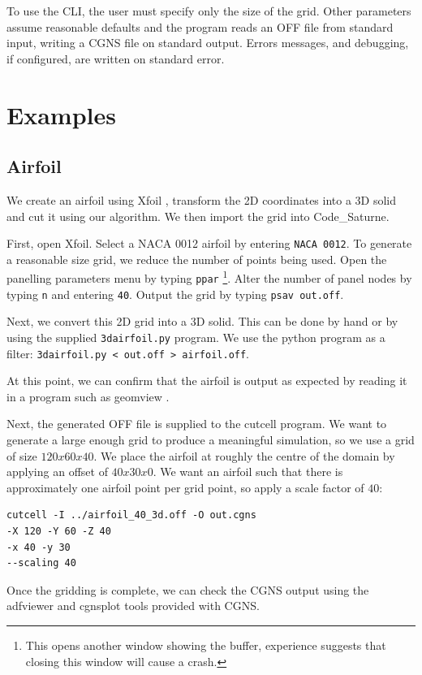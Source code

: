 \documentclass[a4paper,10pt]{article}
\begin{document}
To use the CLI, the user must specify only the size of the grid. Other
parameters assume reasonable defaults and the program reads an OFF file from
standard input, writing a CGNS file on standard output. Errors messages, and
debugging, if configured, are written on standard error.

\section{Examples}

\subsection{Airfoil}

We create an airfoil using Xfoil \cite{xfoil}, transform the 2D coordinates into
a 3D solid and cut it using our algorithm. We then import the grid into
Code\_Saturne.

First, open Xfoil. Select a NACA 0012 airfoil by entering \texttt{NACA 0012}. To
generate a reasonable size grid, we reduce the number of points being used. Open
the panelling parameters menu by typing \texttt{ppar} \footnote{This opens
another window showing the buffer, experience suggests that closing this window
will cause a crash.}. Alter the number of panel nodes by typing \texttt{n} and
entering \texttt{40}. Output the grid by typing \texttt{psav out.off}.

Next, we convert this 2D grid into a 3D solid. This can be done by hand or by
using the supplied \texttt{3dairfoil.py} program. We use the python program as
a filter: \texttt{3dairfoil.py < out.off > airfoil.off}.

At this point, we can confirm that the airfoil is output as expected by reading
it in a program such as geomview \cite{geomview}.

Next, the generated OFF file is supplied to the cutcell program. We want to
generate a large enough grid to produce a meaningful simulation, so we use a
grid of size $120 x 60 x 40$. We place the airfoil at roughly the centre of the
domain by applying an offset of $40 x 30 x 0$. We want an airfoil such that
there is approximately one airfoil point per grid point, so apply a scale
factor of $40$:

\begin{verbatim}
cutcell -I ../airfoil_40_3d.off -O out.cgns
-X 120 -Y 60 -Z 40
-x 40 -y 30
--scaling 40
\end{verbatim}

Once the gridding is complete, we can check the CGNS output using the adfviewer
and cgnsplot tools provided with CGNS.
\end{document}
